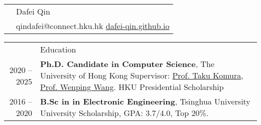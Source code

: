 \documentclass[letterpaper, 11pt]{article}
\newcommand{\headingfont}{\Large\color{OliveGreen}\vspace{-.4cm}}
\newenvironment{SectionTable}[1]{
	\renewcommand*{\arraystretch}{1.2}
	\setlength{\tabcolsep}{10pt} %
	\begin{longtable}{Rp{5.8in}} & #1 \\}
{\end{longtable}\vspace{-.4cm}}
\begin{document}

\begin{SectionTable}{\Huge Dafei Qin} & 
qindafei@connect.hku.hk   \newline
\href{https://dafei-qin.github.io/}{dafei-qin.github.io}
\end{SectionTable}




\begin{SectionTable}{\headingfont Education}




2020 -- 2025 & 
\textbf{Ph.D. Candidate in Computer Science}, The University of Hong Kong \newline
Supervisor: \href{https://www.cs.hku.hk/index.php/people/academic-staff/taku}{Prof. Taku Komura}, \href{https://www.cs.hku.hk/people/academic-staff/wenping}{Prof. Wenping Wang}. \newline
HKU Presidential Scholarship \\

2016 --  2020 &\textbf{B.Sc in in Electronic Engineering},  Tsinghua University \newline
 University Scholarship,  GPA: 3.7/4.0, Top 20\%. 


\end{SectionTable}

\end{document}
